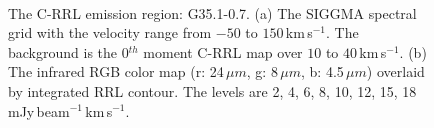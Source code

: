 \documentclass[manuscript]{aastex61}
\newcommand{\kms}{\,km\,s$^{-1}$}
\newcommand{\um}{\mu m}
\begin{document}
\begin{figure}[H]
	\centering
	\\
	\caption{The C-RRL emission region: G35.1-0.7.
	(a) The SIGGMA spectral grid with the velocity range from $-50$ to $150$\kms.
	The background is the 0$^{th}$ moment C-RRL map over $10$ to $40$\kms.
	(b) The infrared RGB color map (r: 24\,$\um$, g: 8\,$\um$, b: 4.5\,$\um$) overlaid by integrated RRL contour.
	The levels are 2, 4, 6, 8, 10, 12, 15, 18 mJy\,beam$^{-1}$\kms.}
	\label{fig_crrl-g351}
\end{figure}
\end{document}
